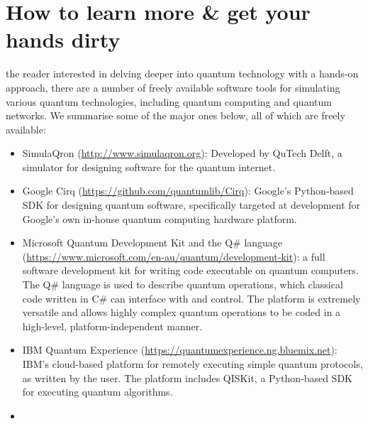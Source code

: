 %
%

\section{How to learn more \& get your hands dirty}

 the reader interested in delving deeper into quantum technology with a hands-on approach, there are a number of freely available software tools for simulating various quantum technologies, including quantum computing and quantum networks. We summarise some of the major ones below, all of which are freely available:

\begin{itemize}
	\item SimulaQron (\href{http://www.simulaqron.org}{http://www.simulaqron.org}): Developed by QuTech Delft, a simulator for designing software for the quantum internet.
	\item Google Cirq (\href{https://github.com/quantumlib/Cirq}{https://github.com/quantumlib/Cirq}): Google's Python-based SDK for designing quantum software, specifically targeted at development for Google's own in-house quantum computing hardware platform.
	\item Microsoft Quantum Development Kit and the Q\# language (\href{https://www.microsoft.com/en-au/quantum/development-kit}{https://www.microsoft.com/en-au/quantum/development-kit}): a full software development kit for writing code executable on quantum computers. The Q\# language is used to describe quantum operations, which classical code written in C\# can interface with and control. The platform is extremely versatile and allows highly complex quantum operations to be coded in a high-level, platform-independent manner.
	\item IBM Quantum Experience (\href{https://quantumexperience.ng.bluemix.net}{https://quantumexperience.ng.bluemix.net}): IBM's cloud-based platform for remotely executing simple quantum protocols, as written by the user. The platform includes QISKit, a Python-based SDK for executing quantum algorithms.
	\item {}
\end{itemize}
